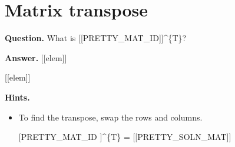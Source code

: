 \documentclass{article}
\begin{document}
\section*{Matrix transpose}
\textbf{Question.} What is [[PRETTY\_MAT\_ID]]\textasciicircum{}\{T\}?

\textbf{Answer.} [[elem]]
                
                
                    [[elem]]

\textbf{Hints.}
\begin{itemize}
  \item To find the transpose, swap the rows and columns.
  \item [[PRETTY\_MAT\_ID]]\textasciicircum{}\{T\} = [[PRETTY\_SOLN\_MAT]]
\end{itemize}
\end{document}
